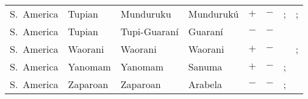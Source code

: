 \begin{landscape}
\begin{longtable}{l>{\raggedright\arraybackslash}p{2.2cm}>{\raggedright}p{2.5cm}>{\raggedright\arraybackslash}p{2.5cm}cc>{\raggedright\arraybackslash}p{3.4cm}>{\raggedright\arraybackslash}p{3.4cm}}
S.~America & Tupian & Munduruku & Mundurukú & $+$ & $-$ & \citealt[passim]{Passer2016a}; \citealt{Gil2013} & \citealt[passim]{Passer2016a}; \citealt[261]{Derbyshire1990}\\
S.~America & Tupian & Tupi-Guaraní & Guaraní & $-$ & $-$ & \citealt{Gil2013} & \citealt{Corbett2013}\\
S.~America & Waorani & Waorani & Waorani & $+$ & $-$ & \citealt{Gil2013} & \citealt[259]{Derbyshire1990}; \citealt[125--128]{Peeke1973}\\
S.~America & Yanomam & Yanomam & Sanuma & $+$ & $-$ & \citealt{Gil2013}; \citealt[246--248]{Derbyshire1990} & \citealt[144--149, 197--198]{Borgman1990}\\
S.~America & Zaparoan & Zaparoan & Arabela & $-$ & $-$ & \citealt{Gil2013}; \citealt[256--257]{Derbyshire1990} & \citealt[22--23, 35--36]{Rich1999}\\
\end{longtable}

\end{landscape}
